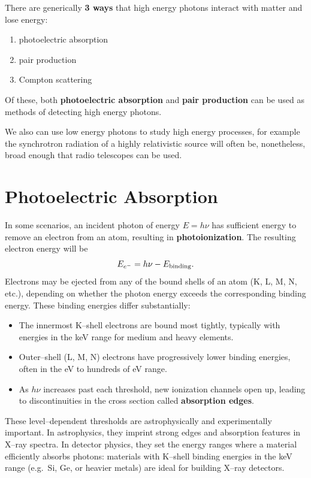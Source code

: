 There are generically \textbf{3 ways} that high energy photons interact with matter and lose energy:
\begin{enumerate}
    \item photoelectric absorption
    \item pair production
    \item Compton scattering
\end{enumerate}
Of these, both \textbf{photoelectric absorption} and \textbf{pair production} can be used as methods of detecting high energy photons.
\begin{remark}
    We also can use low energy photons to study high energy processes, for example the synchrotron radiation of a highly relativistic source will often be, nonetheless, broad enough that radio telescopes can be used.
\end{remark}

\section{Photoelectric Absorption}

In some scenarios, an incident photon of energy $E = h\nu$ has
sufficient energy to remove an electron from an atom, resulting in
\textbf{photoionization}. The resulting electron energy will be
\[
    E_{e^-} = h\nu - E_{\rm binding}.
\]
Electrons may be ejected from any of the bound shells of an atom (K, L,
M, N, etc.), depending on whether the photon energy exceeds the
corresponding binding energy. These binding energies differ
substantially:
\begin{itemize}
    \item The innermost K--shell electrons are bound most tightly,
          typically with energies in the keV range for medium and
          heavy elements.
    \item Outer--shell (L, M, N) electrons have progressively lower
          binding energies, often in the eV to hundreds of eV range.
    \item As $h\nu$ increases past each threshold, new ionization
          channels open up, leading to discontinuities in the
          cross section called \textbf{absorption edges}.
\end{itemize}
These level--dependent thresholds are astrophysically and
experimentally important. In astrophysics, they imprint strong edges
and absorption features in X--ray spectra. In detector physics, they
set the energy ranges where a material efficiently absorbs photons:
materials with K--shell binding energies in the keV range (e.g.~Si,
Ge, or heavier metals) are ideal for building X--ray detectors.

